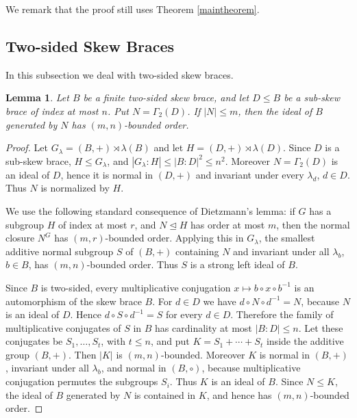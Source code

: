 \documentclass[10pt,a4paper]{amsart}
\numberwithin{equation}{section}
\newtheorem{lemma}[equation]{Lemma}
\begin{document}
We remark that  the proof still uses Theorem \ref{maintheorem}. 





\subsection{Two-sided Skew Braces}

In this subsection we deal with two-sided skew braces.
\begin{lemma}\label{lem:bounded-ideal-closure-two-sided}
Let $B$ be a finite two-sided skew brace, and let $D\leqslant B$ be a
sub-skew brace of index at most $n$. Put $N=\Gamma_2(D)$. If $|N|\leqslant m$,
then the ideal of $B$ generated by $N$ has $(m,n)$-bounded order.
\end{lemma}

\begin{proof}
Let $G_\lambda=(B,+)\rtimes\lambda(B)$ and let
$H=(D,+)\rtimes\lambda(D)$. Since $D$ is a sub-skew brace, $H\leqslant G_\lambda$,
and $|G_\lambda:H| \leqslant |B:D|^2\leqslant n^2$. Moreover $N=\Gamma_2(D)$ is an
ideal of $D$, hence it is normal in $(D,+)$ and invariant under every
$\lambda_d$, $d\in D$. Thus $N$ is normalized by $H$.

We use the following standard consequence of Dietzmann's lemma: if $G$ has
a subgroup $H$ of index at most $r$, and $N\unlhd H$ has order at most $m$,
then the normal closure $N^G$ has $(m,r)$-bounded order. Applying this in
$G_\lambda$, the smallest additive normal subgroup $S$ of $(B,+)$ containing
$N$ and invariant under all $\lambda_b$, $b\in B$, has $(m,n)$-bounded order.
Thus $S$ is a strong left ideal of $B$.

Since $B$ is two-sided, every multiplicative conjugation
$x\mapsto b\circ x\circ b^{-1}$ is an automorphism of the skew brace $B$.
For $d\in D$ we have $d\circ N\circ d^{-1}=N$, because $N$ is an ideal of
$D$. Hence $d\circ S\circ d^{-1}=S$ for every $d\in D$. Therefore the family
of multiplicative conjugates of $S$ in $B$ has cardinality at most
$|B:D| \leqslant n$. Let these conjugates be $S_1,\ldots,S_t$, with $t\leqslant n$, and
put $K=S_1+\cdots+S_t$ inside the additive group $(B,+)$. Then $|K|$ is
$(m,n)$-bounded. Moreover $K$ is normal in $(B,+)$, invariant under all
$\lambda_b$, and normal in $(B,\circ)$, because multiplicative conjugation
permutes the subgroups $S_i$. Thus $K$ is an ideal of $B$. Since
$N\leqslant K$, the ideal of $B$ generated by $N$ is contained in $K$, and hence
has $(m,n)$-bounded order.
\end{proof}
\end{document}
